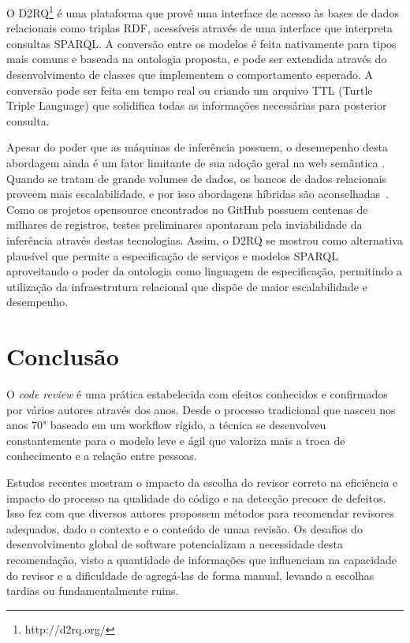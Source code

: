 \documentclass[a4paper,12pt]{monografia}
\theoremstyle{plain}
\theoremstyle{definition}
\theoremstyle{remark}
\begin{document}
O D2RQ\footnote{http://d2rq.org/} é uma plataforma que provê uma interface de acesso às bases de dados relacionais como triplas RDF, acessíveis através de uma interface que interpreta consultas SPARQL. A conversão entre os modelos é feita nativamente para tipos mais comuns e baseada na ontologia proposta, e pode ser extendida através do desenvolvimento de classes que implementem o comportamento esperado. A conversão pode ser feita em tempo real ou criando um arquivo TTL (Turtle Triple Language) que solidifica todas as informações necessárias para posterior consulta.

Apesar do poder que as máquinas de inferência possuem, o desemepenho desta abordagem ainda é um fator limitante de sua adoção geral na web semântica \cite{shvaiko2013}. Quando se tratam de grande volumes de dados, os bancos de dados relacionais proveem mais escalabilidade, e por isso abordagens híbridas são aconselhadas~\cite{hepp2008}. Como os projetos opensource encontrados no GitHub possuem centenas de milhares de registros, testes preliminares apontaram pela inviabilidade da inferência através destas tecnologias. Assim, o D2RQ se mostrou como alternativa plausível que permite a especificação de serviços e modelos SPARQL aproveitando o poder da ontologia como linguagem de especificação, permitindo a utilização da infraestrutura relacional que dispõe de maior escalabilidade e desempenho.

\chapter{Conclusão}\label{cha:conclusao}

O \textit{code review} é uma prática estabelecida com efeitos conhecidos e confirmados por vários autores através dos anos. Desde o processo tradicional que nasceu nos anos 70" baseado em um workflow rígido, a técnica se desenvolveu constantemente para o modelo leve e ágil que valoriza mais a troca de conhecimento e a relação entre pessoas.

Estudos recentes mostram o impacto da escolha do revisor correto na eficiência e impacto do processo na qualidade do código e na detecção precoce de defeitos. Isso fez com que diversos autores propossem métodos para recomendar revisores adequados, dado o contexto e o conteúdo de umaa revisão. Os desafios do desenvolvimento global de software potencializam a necessidade desta recomendação, visto a quantidade de informações que influenciam na capacidade do revisor e a dificuldade de agregá-las de forma manual, levando a escolhas tardias ou fundamentalmente ruins.
\end{document}
